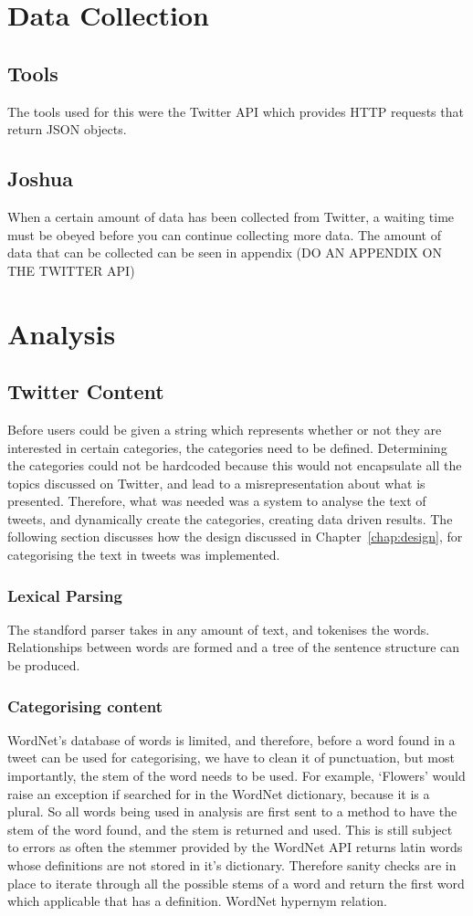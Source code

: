\section{Data Collection}
\subsection{Tools}
The tools used for this were the Twitter API which provides HTTP requests that return JSON objects.
\subsection{Joshua}
When a certain amount of data has been collected from Twitter, a waiting time must be obeyed before you can continue collecting more data. The amount of data that can be collected can be seen in appendix (DO AN APPENDIX ON THE TWITTER API)

\section{Analysis}


\subsection{Twitter Content}
Before users could be given a string which represents whether or not they are interested in certain categories, the categories need to be defined. Determining the categories could not be hardcoded because this would not encapsulate all the topics discussed on Twitter, and lead to a misrepresentation about what is presented. Therefore, what was needed was a system to analyse the text of tweets, and dynamically create the categories, creating data driven results. The following section discusses how the design discussed in Chapter~\ref{chap:design}, for categorising the text in tweets was implemented.
\subsubsection{Lexical Parsing}
The standford parser takes in any amount of text, and tokenises the words. Relationships between words are formed and a tree of the sentence structure can be produced. 
\subsubsection{Categorising content}
WordNet's database of words is limited, and therefore, before a word found in a tweet can be used for categorising, we have to clean it of punctuation, but most importantly, the stem of the word needs to be used. For example, `Flowers' would raise an exception if searched for in the WordNet dictionary, because it is a plural. So all words being used in analysis are first sent to a method to have the stem of the word found, and the stem is returned and used. This is still subject to errors as often the stemmer provided by the WordNet API returns latin words whose definitions are not stored in it's dictionary. Therefore sanity checks are in place to iterate through all the possible stems of a word and return the first word which applicable that has a definition. 
WordNet hypernym relation.
